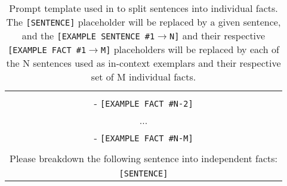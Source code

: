\begin{table}[th]
\begin{tabular}{c}
{            - \texttt{[EXAMPLE FACT \#N-1]}\\
            - \texttt{[EXAMPLE FACT \#N-2]}\\
            ...\\
            - \texttt{[EXAMPLE FACT \#N-M]}\\
            \\
            Please breakdown the following sentence into independent facts:\\
            \texttt{[SENTENCE]}
        } \\
        \bottomrule
    \end{tabular}
    \vspace{-1mm}
    \caption{
    Prompt template used in \safe{} to split sentences into individual facts.
    The \texttt{[SENTENCE]} placeholder will be replaced by a given sentence, and the \texttt{[EXAMPLE SENTENCE \#1$\rightarrow$N]} and their respective \texttt{[EXAMPLE FACT \#1$\rightarrow$M]} placeholders will be replaced by each of the N sentences used as in-context exemplars and their respective set of M individual facts.
    }
    \label{tab:safe-get-individual-facts-prompt-template}
    \vspace{-2mm}
\end{table}